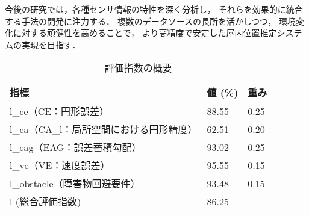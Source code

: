今後の研究では，各種センサ情報の特性を深く分析し，
それらを効果的に統合する手法の開発に注力する．
複数のデータソースの長所を活かしつつ，
環境変化に対する頑健性を高めることで，
より高精度で安定した屋内位置推定システムの実現を目指す．


\begin{table}[ht]
	\caption{評価指数の概要}
	\centering
	\begin{tabular}{l|l|l}
		\hline
		指標                        & 値 (\%) & 重み   \\ \hline
		l\_ce（CE：円形誤差）            & 88.55  & 0.25 \\
		l\_ca（CA\_l：局所空間における円形精度） & 62.51  & 0.20 \\
		l\_eag（EAG：誤差蓄積勾配）        & 93.02  & 0.25 \\
		l\_ve（VE：速度誤差）            & 95.55  & 0.15 \\
		l\_obstacle（障害物回避要件）      & 93.48  & 0.15 \\
		l (総合評価指数)                & 86.25  &      \\ \hline
	\end{tabular}
	\label{table:evaluation_index}
\end{table}


